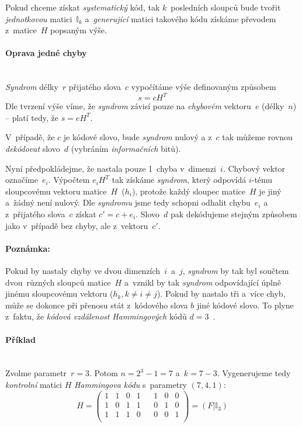 \documentclass[thesis=M,czech,hidelinks]{FITthesis}[2012/06/26]
\newcommand{\0}{{\textcolor[gray]{0.75}{0}}}
\begin{document}
Pokud chceme získat \emph{systematický} kód, tak $k$~posledních sloupců bude
tvořit \emph{jednotkovou} matici~$\mathbb{I}_k$ a~\emph{generující} matici
takového kódu získáme převodem z~matice~$H$ popsaným výše.

\paragraph{Oprava jedné chyby} \hfill \\
\emph{Syndrom} délky~$r$ přijatého slova~$c$ vypočítáme výše definovaným
způsobem
$$ s = cH^T $$
Dle tvrzení výše víme, že \emph{syndrom} závisí pouze na \emph{chybovém}
vektoru~$e$ (délky~$n$) -- platí tedy, že $s = e H^T$.

V~případě, že $c$ je kódové slovo, bude \emph{syndrom} nulový a z~$c$ tak můžeme
rovnou \emph{dekódovat} slovo~$d$ (vybráním \emph{informačních} bitů).

Nyní předpokládejme, že nastala pouze 1~chyba v~dimenzi~$i$. Chybový vektor
označíme~$e_i$. Výpočtem $e_i H^T$ tak získáme \emph{syndrom}, který odpovídá
$i$-tému sloupcovému vektoru matice~$H$~($h_i$), protože každý sloupec
matice~$H$ je jiný a~žádný není nulový. Dle \emph{syndromu} jsme tedy schopni
odhalit chybu~$e_i$ a z~přijatého slova~$c$ získat $c' = c + e_i$. Slovo~$d$ pak
dekódujeme stejným způsobem jako v~případě bez chyby, ale z~vektoru~$c'$.

\paragraph{Poznámka:} Pokud by nastaly chyby ve dvou dimenzích~$i$~a~$j$,
\emph{syndrom} by tak byl součtem dvou~různých sloupců matice~$H$ a~vznikl by
tak \emph{syndrom} odpovídající úplně jinému sloupcovému vektoru
($h_k, k \neq i \neq j$). Pokud by nastalo tři a~více chyb, může se dokonce při
přenosu stát z~kódového slova $b$ jiné kódové slovo. To plyne z~faktu, že
\emph{kódová vzdálenost} \emph{Hammingových} kódů $d=3$~\cite{Adamek}.

\paragraph{Příklad} \hfill \\
Zvolme parametr~$r = 3$. Potom $n = 2^3 - 1 = 7$ a~$k = 7-3$. Vygenerujeme tedy
\emph{kontrolní} matici $H$ \emph{Hammingova kódu} s~parametry $(7,4,1)$:
$$
    H = \left(
    \begin{array}{*{8}{c}}
        1 & 1 & 0 & 1 & & 1 & 0 & 0 \\
        1 & 0 & 1 & 1 & & 0 & 1 & 0 \\
        1 & 1 & 1 & 0 & & 0 & 0 & 1 \\
    \end{array}
    \right) = \left( F | \mathbb{I}_3 \right)
$$
\end{document}
